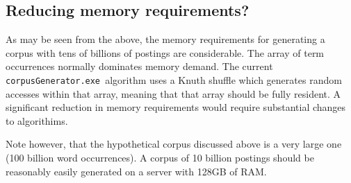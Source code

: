 \documentclass{article}
\newcommand{\gac}{\texttt{corpusGenerator.exe~}}
\begin{document}
\subsection{Reducing memory requirements?}
As may be seen from the above, the memory requirements for generating
a corpus with tens of billions of postings are considerable.
The array of term occurrences normally
dominates memory demand.  The current \gac algorithm uses a Knuth
shuffle which generates random accesses within that array, meaning
that that array should be fully resident.   A significant reduction in
memory requirements would require substantial changes to algorithims.

Note however, that the hypothetical corpus discussed above is a very
large one (100 billion word occurrences).  A corpus of 10 billion
postings should be reasonably easily generated on a server with 128GB of
RAM.





 
\end{document}
